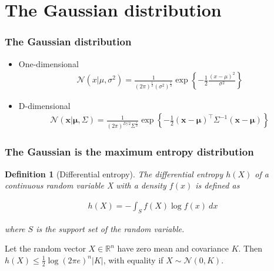 \documentclass{beamer}
\newtheorem{probDef}{Definition}
\begin{document}
\section{The Gaussian distribution}

\begin{frame}
\frametitle{The Gaussian distribution}

    \begin{itemize}
        \item One-dimensional
        \begin{align*}
            \mathcal{N}(x|\mu,\sigma^2)=\frac{1}{(2\pi)^\frac{1}{2}(\sigma^2)^\frac{1}{2}}\exp\left\{-\frac{1}{2}\frac{(x-\mu)^2}{\sigma^2}\right\}
        \end{align*}
        \item D-dimensional
        \begin{align*}
            \mathcal{N}(\mathbf{x}|\boldsymbol{\mu},\Sigma)=\frac{1}{(2\pi)^{D/2}\Sigma^{\frac{1}{2}}}\exp\left\{-\frac{1}{2}(\mathbf{x}-\boldsymbol{\mu})^\intercal\Sigma^{-1}(\mathbf{x}-\boldsymbol{\mu})\right\}
        \end{align*}
    \end{itemize}

\end{frame}

\begin{frame}
    \frametitle{The Gaussian is the maximum entropy distribution
    \citep{coverAndThomas91}}

    \begin{probDef}[Differential entropy]
        The \textit{differential entropy} $h(X)$ of a continuous random
        variable X with a density $f(x)$ is defined as

        \begin{align*}
            h(X)=-\int_Sf(X)\log f(x)\ dx
        \end{align*}

        where $S$ is the support set of the random variable.
    \end{probDef}

    \begin{theorem}
        Let the random vector $X\in\mathbb{R}^n$ have zero mean and covariance
        $K$. Then $h(X)\le\frac{1}{2}\log(2\pi e)^n|K|$, with equality if
        $X\sim\mathcal{N}(0,K)$.
    \end{theorem}

\end{frame}
\end{document}
